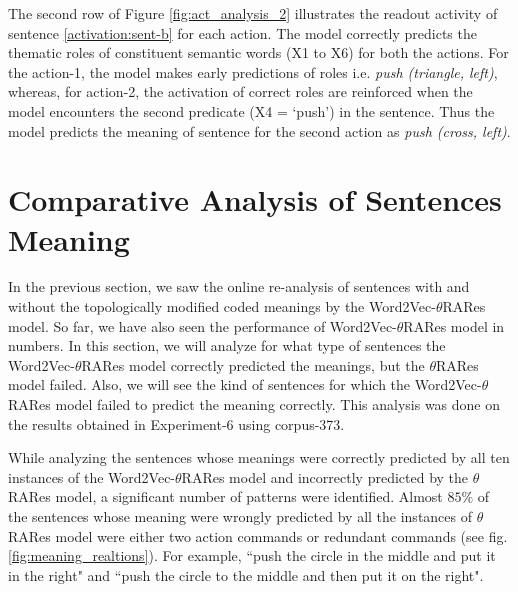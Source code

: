 The second row of Figure \ref{fig:act_analysis_2} illustrates the readout activity of sentence \ref{activation:sent-b} for each action. The model correctly predicts the thematic roles of constituent semantic words (X1 to X6) for both the actions. For the action-1, the model makes early predictions of roles i.e. \textit{push (triangle, left)}, whereas, for action-2, the activation of correct roles are reinforced when the model encounters the second predicate (X4 = `push') in the sentence. Thus the model predicts the meaning of sentence for the second action as \textit{push (cross, left)}.

\section{Comparative Analysis of Sentences Meaning}

In the previous section, we saw the online re-analysis of sentences with and without the topologically modified coded meanings by the Word2Vec-$\theta$RARes model. So far, we have also seen the performance of Word2Vec-$\theta$RARes model in numbers. In this section, we will analyze for what type of sentences the Word2Vec-$\theta$RARes model correctly predicted the meanings, but the $\theta$RARes model failed. Also, we will see the kind of sentences for which the Word2Vec-$\theta$RARes model failed to predict the meaning correctly. This analysis was done on the results obtained in Experiment-6 using corpus-373.

While analyzing the sentences whose meanings were correctly predicted by all ten instances of the Word2Vec-$\theta$RARes model and incorrectly predicted by the $\theta$RARes model, a significant number of patterns were identified. Almost $85 \%$ of the sentences whose meaning were wrongly predicted by all the instances of $\theta$RARes model were either two action commands or redundant commands (see fig. \ref{fig:meaning_realtions}). For example, ``push the circle in the middle and put it in the right" and ``push the circle to the middle and then put it on the right".

